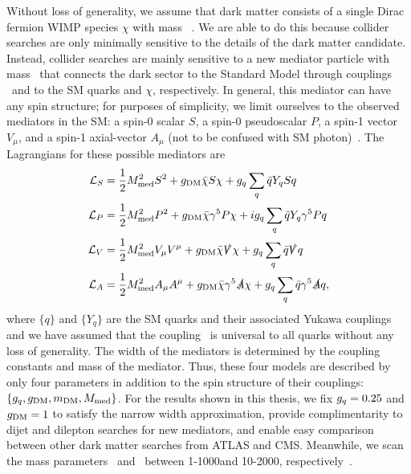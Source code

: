 Without loss of generality, we assume that dark matter consists of a single Dirac fermion WIMP species $\chi$ with mass \mdm~\cite{DMF2015}.
We are able to do this because collider searches are only minimally sensitive to the details of the dark matter candidate.
Instead, collider searches are mainly sensitive to a new mediator particle with mass \mmed\ that connects the dark sector to the Standard Model through couplings \gq\ and \gdm to the SM quarks and $\chi$, respectively.
In general, this mediator can have any spin structure; for purposes of simplicity, we limit ourselves to the observed mediators in the SM: a spin-0 scalar $S$, a spin-0 pseudoscalar $P$, a spin-1 vector $V_\mu$, and a spin-1 axial-vector $A_\mu$ (not to be confused with SM photon)~\cite{Harris2015}.
The Lagrangians for these possible mediators are
\begin{align}
  \mathcal{L}_{S} & = \frac{1}{2} M_{\text{med}}^2 S^2 + g_{\text{DM}} \bar \chi S \chi + g_{{q}} \sum\limits_q \bar q Y_q S q \\
  \mathcal{L}_{P} & = \frac{1}{2} M_{\text{med}}^2 P^2 + g_{\text{DM}} \bar \chi \gamma^5 P \chi + i g_{{q}} \sum\limits_q \bar q Y_q \gamma^5 P q \\
  \mathcal{L}_{V} & = \frac{1}{2} M_{\text{med}}^2 V_\mu V^\mu + g_{\text{DM}} \bar \chi \slashed V \chi + g_{{q}} \sum\limits_q \bar q \slashed V q \\
  \mathcal{L}_{A} & = \frac{1}{2} M_{\text{med}}^2 A_\mu A^\mu + g_{\text{DM}} \bar \chi \gamma^5 \slashed A \chi + g_{{q}} \sum\limits_q \bar q \gamma^5 \slashed A q ,
\end{align}
where $\{q\}$ and $\{Y_q\}$ are the SM quarks and their associated Yukawa couplings and we have assumed that the coupling \gq\ is universal to all quarks without any loss of generality.
The width of the mediators is determined by the coupling constants and mass of the mediator.
Thus, these four models are described by only four parameters in addition to the spin structure of their couplings: $\{g_{{q}}, g_{\text{DM}}, m_{\text{DM}}, M_{\text{med}}\}$.
For the results shown in this thesis, we fix $g_{{q}} = 0.25$ and $g_{\text{DM}} = 1$ to satisfy the narrow width approximation, provide complimentarity to dijet and dilepton searches for new mediators, and enable easy comparison between other dark matter searches from ATLAS and CMS. 
Meanwhile, we scan the mass parameters \mdm\ and \mmed\ between 1-1000\GeV and 10-2000\GeV, respectively~\cite{DMF2015}.

